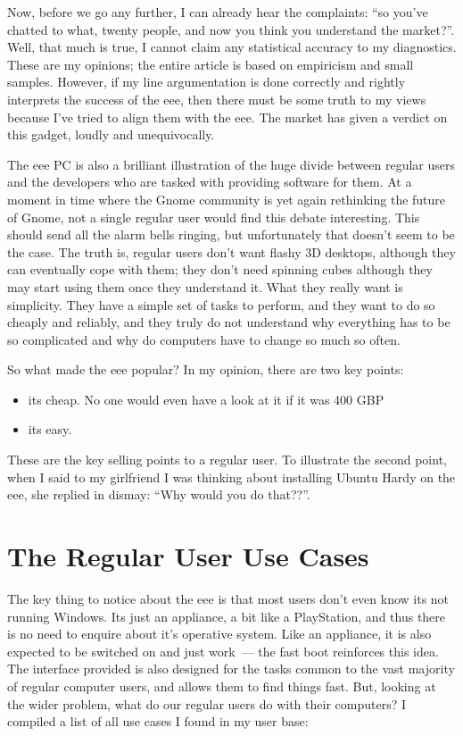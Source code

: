 \documentclass{book}
\begin{document}
Now, before we go any further, I can already hear the complaints: ``so
you've chatted to what, twenty people, and now you think you
understand the market?''. Well, that much is true, I cannot claim any
statistical accuracy to my diagnostics. These are my opinions; the
entire article is based on empiricism and small samples. However, if
my line argumentation is done correctly and rightly interprets the
success of the eee, then there must be some truth to my views because
I've tried to align them with the eee. The market has given a verdict
on this gadget, loudly and unequivocally.

The eee PC is also a brilliant illustration of the huge divide between
regular users and the developers who are tasked with providing
software for them. At a moment in time where the Gnome community is
yet again rethinking the future of Gnome, not a single regular user
would find this debate interesting. This should send all the alarm
bells ringing, but unfortunately that doesn't seem to be the case. The
truth is, regular users don't want flashy 3D desktops, although they
can eventually cope with them; they don't need spinning cubes although
they may start using them once they understand it. What they really
want is simplicity. They have a simple set of tasks to perform, and
they want to do so cheaply and reliably, and they truly do not
understand why everything has to be so complicated and why do
computers have to change so much so often.

So what made the eee popular? In my opinion, there are two key points:

\begin{itemize}
\item its cheap. No one would even have a look at it if it was 400 GBP
\item its easy.
\end{itemize}

These are the key selling points to a regular user. To illustrate the
second point, when I said to my girlfriend I was thinking about
installing Ubuntu Hardy on the eee, she replied in dismay: ``Why would
you do that??''.

\section{The Regular User Use Cases}

The key thing to notice about the eee is that most users don't even
know its not running Windows. Its just an appliance, a bit like a
PlayStation, and thus there is no need to enquire about it's operative
system. Like an appliance, it is also expected to be switched on and
just work~--- the fast boot reinforces this idea. The interface
provided is also designed for the tasks common to the vast majority of
regular computer users, and allows them to find things fast. But,
looking at the wider problem, what do our regular users do with their
computers?  I compiled a list of all use cases I found in my user
base:
\end{document}
